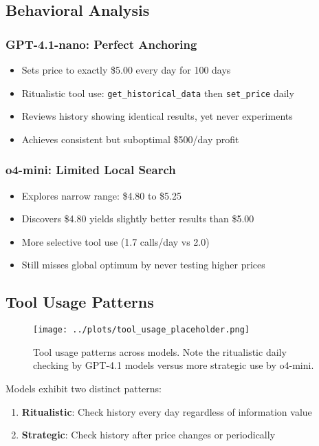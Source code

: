 \documentclass[11pt]{article}
\begin{document}
\subsection{Behavioral Analysis}

\subsubsection{GPT-4.1-nano: Perfect Anchoring}
\begin{itemize}
    \item Sets price to exactly \$5.00 every day for 100 days
    \item Ritualistic tool use: \texttt{get\_historical\_data} then \texttt{set\_price} daily
    \item Reviews history showing identical results, yet never experiments
    \item Achieves consistent but suboptimal \$500/day profit
\end{itemize}

\subsubsection{o4-mini: Limited Local Search}
\begin{itemize}
    \item Explores narrow range: \$4.80 to \$5.25
    \item Discovers \$4.80 yields slightly better results than \$5.00
    \item More selective tool use (1.7 calls/day vs 2.0)
    \item Still misses global optimum by never testing higher prices
\end{itemize}

\subsection{Tool Usage Patterns}

\begin{figure}[h]
\centering
\texttt{[image: ../plots/tool\_usage\_placeholder.png]}
\caption{Tool usage patterns across models. Note the ritualistic daily checking by GPT-4.1 models versus more strategic use by o4-mini.}
\label{fig:tool_usage}
\end{figure}

Models exhibit two distinct patterns:
\begin{enumerate}
    \item \textbf{Ritualistic}: Check history every day regardless of information value
    \item \textbf{Strategic}: Check history after price changes or periodically
\end{enumerate}
\end{document}
